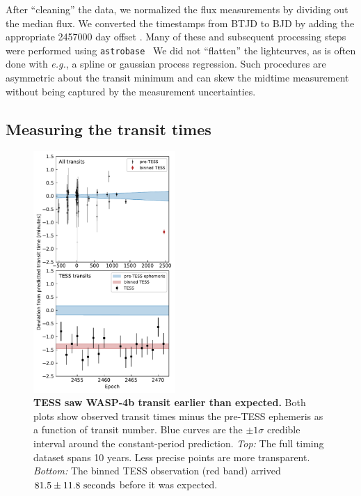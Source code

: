 \documentclass[12pt,twocolumn,tighten]{aastex62}
\begin{document}
After ``cleaning'' the data, we normalized the flux measurements by
dividing out the median flux.  We converted the timestamps from BTJD
to BJD by adding the appropriate 2457000 day offset
\citep{tess_data_product_description_2018}.  Many of these and
subsequent processing steps were performed using
\texttt{astrobase}~\citep{bhatti_astrobase_2018} We did not
``flatten'' the lightcurves, as is often done with {\it
e.g.}, a spline or gaussian process regression.  Such procedures are
asymmetric about the transit minimum and can skew the midtime
measurement without being captured by the measurement uncertainties.



\subsection{Measuring the transit times}
\label{sec:measurement}

\begin{figure}[t]
    \begin{center}
        \leavevmode
        \includegraphics[width=0.48\textwidth]{f2.pdf}
    \end{center}
    \vspace{-0.6cm}
    \caption{
        {\bf TESS saw WASP-4b transit earlier than expected.} Both
        plots show observed transit times minus the pre-TESS ephemeris
        as a function of transit number.  Blue curves are the $\pm
        1\sigma$ credible interval around the constant-period
        prediction.  {\it Top:} The full timing dataset spans 10
        years.  Less precise points are more transparent.  {\it
        Bottom:} The binned TESS observation (red band) arrived $81.5
        \pm 11.8\ {\rm seconds}$ before it was expected.
        \label{fig:arrived_early}
    }
\end{figure}
\end{document}
